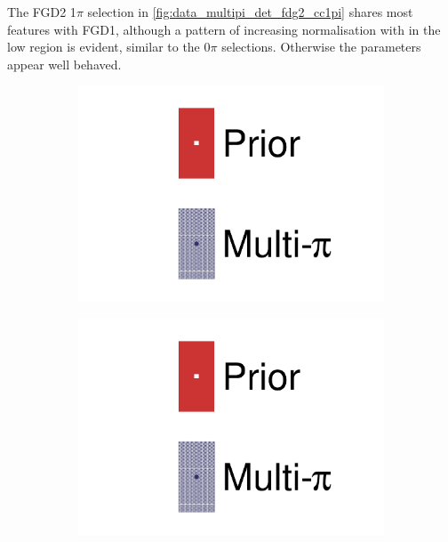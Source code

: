The FGD2 1$\pi$ selection in \autoref{fig:data_multipi_det_fdg2_cc1pi} shares most features with FGD1, although a pattern of increasing normalisation with \pmu in the low \cosmu region is evident, similar to the 0$\pi$ selections. Otherwise the parameters appear well behaved.
\begin{figure}[h]
	\centering
	\begin{subfigure}[t]{0.1\textwidth}
		\includegraphics[width=\textwidth,page=1, trim={0mm 120mm 40mm 20mm}, clip]{figures/mach3/2018/data/2018a_FixedCov_RedCov_Mpi_Data_merge_drawPar_withDet}
	\end{subfigure}
	\begin{subfigure}[t]{0.1\textwidth}
		\includegraphics[width=\textwidth,page=1, trim={0mm 20mm 40mm 120mm}, clip]{figures/mach3/2018/data/2018a_FixedCov_RedCov_Mpi_Data_merge_drawPar_withDet}
	\end{subfigure}
	

\end{figure}
